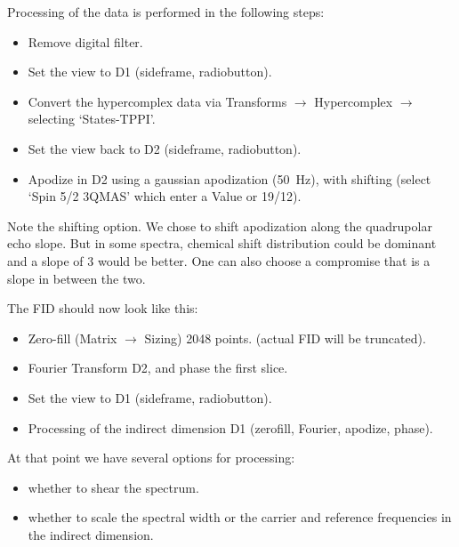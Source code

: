 \documentclass[11pt,a4paper]{article}
\begin{document}
Processing of the data is performed in the following steps:
\begin{itemize}
  \item Remove digital filter.
  \item Set the view to D1 (sideframe, radiobutton).
  \item Convert the hypercomplex data via Transforms  $\longrightarrow$ Hypercomplex  $\longrightarrow$
   selecting `States-TPPI'.
  \item Set the view back to D2 (sideframe, radiobutton).
  \item Apodize in D2 using a gaussian apodization (50~Hz), with shifting (select `Spin 5/2 3QMAS' which enter a Value or 19/12).
\end{itemize}

Note the shifting option. We chose to shift apodization along the quadrupolar echo slope. But in some spectra, chemical shift 
distribution could be dominant and a slope of 3 would be better. One can also choose a compromise that is a slope in between
the two.

The FID should now look like this:
\begin{center}
\end{center}

\begin{itemize}
  \item Zero-fill (Matrix $\longrightarrow$  Sizing) 2048 points. (actual FID will be truncated).
  \item Fourier Transform D2, and phase the first slice.
  \item Set the view to D1 (sideframe, radiobutton).
  \item Processing of the indirect dimension D1 (zerofill, Fourier, apodize, phase).
\end{itemize}

At that point we have several options for processing:
\begin{itemize}
  \item whether to shear the spectrum.
  \item whether to scale the spectral width or the carrier and reference frequencies in the indirect dimension.
\end{itemize}
\end{document}
